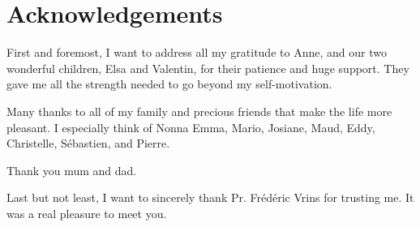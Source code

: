 \documentclass[a4paper, 12pt]{report}
\begin{document}
\chapter*{Acknowledgements}

First and foremost, I want to address all my gratitude to Anne, and our two wonderful children, Elsa and Valentin, for their patience and huge support. They gave me all the strength needed to go beyond my self-motivation.

Many thanks to all of my family and precious friends that make the life more pleasant. I especially think of Nonna Emma, Mario, Josiane, Maud, Eddy, Christelle, Sébastien, and Pierre. 

Thank you mum and dad.

Last but not least, I want to sincerely thank Pr. Frédéric Vrins for trusting me. It was a real pleasure to meet you.




{
\tableofcontents
\clearpage

\listoffigures
 \clearpage
 
 
\listoftables}
\clearpage



\end{document}
